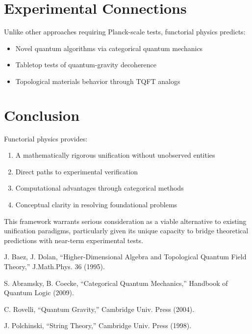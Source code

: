 \documentclass[11pt,a4paper]{article}
\begin{document}
\section{Experimental Connections}

Unlike other approaches requiring Planck-scale tests, functorial physics predicts:

\begin{itemize}
\item Novel quantum algorithms via categorical quantum mechanics
\item Tabletop tests of quantum-gravity decoherence
\item Topological materials behavior through TQFT analogs
\end{itemize}

\section{Conclusion}
Functorial physics provides:
\begin{enumerate}
\item A mathematically rigorous unification without unobserved entities
\item Direct paths to experimental verification
\item Computational advantages through categorical methods
\item Conceptual clarity in resolving foundational problems
\end{enumerate}

This framework warrants serious consideration as a viable alternative to existing unification paradigms, particularly given its unique capacity to bridge theoretical predictions with near-term experimental tests.

\begin{thebibliography}{9}
J. Baez, J. Dolan, ``Higher-Dimensional Algebra and Topological Quantum Field Theory,'' J.Math.Phys. 36 (1995).

S. Abramsky, B. Coecke, ``Categorical Quantum Mechanics,'' Handbook of Quantum Logic (2009).

C. Rovelli, ``Quantum Gravity,'' Cambridge Univ. Press (2004).

J. Polchinski, ``String Theory,'' Cambridge Univ. Press (1998).
\end{thebibliography}
\end{document}
